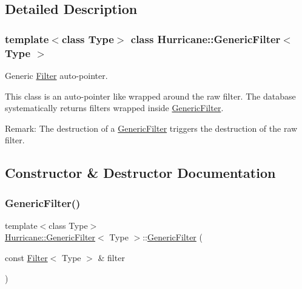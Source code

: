 \subsection{Detailed Description}
\subsubsection*{template$<$class Type$>$\newline
class Hurricane\+::\+Generic\+Filter$<$ Type $>$}

Generic \hyperlink{classHurricane_1_1Filter}{Filter} auto-\/pointer. 

This class is an auto-\/pointer like wrapped around the raw filter. The database systematically returns filters wrapped inside \hyperlink{classHurricane_1_1GenericFilter}{Generic\+Filter}.

\begin{DoxyParagraph}{Remark\+:}
The destruction of a \hyperlink{classHurricane_1_1GenericFilter}{Generic\+Filter} triggers the destruction of the raw filter. 
\end{DoxyParagraph}


\subsection{Constructor \& Destructor Documentation}
\mbox{\label{classHurricane_1_1GenericFilter_a1aae208fe9937dd3a6f706ceb8b3b9b4}} 
\subsubsection{\texorpdfstring{Generic\+Filter()}{GenericFilter()}\hspace{0.1cm}{\footnotesize\ttfamily [1/3]}}
{\footnotesize\ttfamily template$<$class Type$>$ \\
\hyperlink{classHurricane_1_1GenericFilter}{Hurricane\+::\+Generic\+Filter}$<$ Type $>$\+::\hyperlink{classHurricane_1_1GenericFilter}{Generic\+Filter} (\begin{DoxyParamCaption}\item[{const \hyperlink{classHurricane_1_1Filter}{Filter}$<$ Type $>$ \&}]{filter }\end{DoxyParamCaption})\hspace{0.3cm}{\ttfamily [inline]}}

